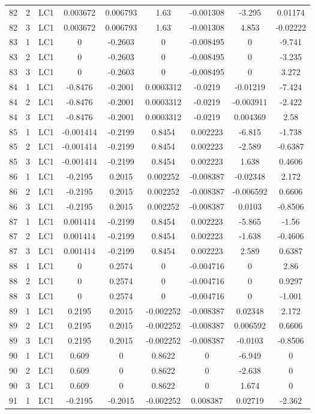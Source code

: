 \documentclass{article}%
\begin{document}
\begin{longtable}{| c c c | c c c c c c |}
82&2&LC1&0.003672&0.006793&1.63&{-}0.001308&{-}3.295&0.01174\\%
82&3&LC1&0.003672&0.006793&1.63&{-}0.001308&4.853&{-}0.02222\\%
83&1&LC1&0&{-}0.2603&0&{-}0.008495&0&{-}9.741\\%
83&2&LC1&0&{-}0.2603&0&{-}0.008495&0&{-}3.235\\%
83&3&LC1&0&{-}0.2603&0&{-}0.008495&0&3.272\\%
84&1&LC1&{-}0.8476&{-}0.2001&0.0003312&{-}0.0219&{-}0.01219&{-}7.424\\%
84&2&LC1&{-}0.8476&{-}0.2001&0.0003312&{-}0.0219&{-}0.003911&{-}2.422\\%
84&3&LC1&{-}0.8476&{-}0.2001&0.0003312&{-}0.0219&0.004369&2.58\\%
85&1&LC1&{-}0.001414&{-}0.2199&0.8454&0.002223&{-}6.815&{-}1.738\\%
85&2&LC1&{-}0.001414&{-}0.2199&0.8454&0.002223&{-}2.589&{-}0.6387\\%
85&3&LC1&{-}0.001414&{-}0.2199&0.8454&0.002223&1.638&0.4606\\%
86&1&LC1&{-}0.2195&0.2015&0.002252&{-}0.008387&{-}0.02348&2.172\\%
86&2&LC1&{-}0.2195&0.2015&0.002252&{-}0.008387&{-}0.006592&0.6606\\%
86&3&LC1&{-}0.2195&0.2015&0.002252&{-}0.008387&0.0103&{-}0.8506\\%
87&1&LC1&0.001414&{-}0.2199&0.8454&0.002223&{-}5.865&{-}1.56\\%
87&2&LC1&0.001414&{-}0.2199&0.8454&0.002223&{-}1.638&{-}0.4606\\%
87&3&LC1&0.001414&{-}0.2199&0.8454&0.002223&2.589&0.6387\\%
88&1&LC1&0&0.2574&0&{-}0.004716&0&2.86\\%
88&2&LC1&0&0.2574&0&{-}0.004716&0&0.9297\\%
88&3&LC1&0&0.2574&0&{-}0.004716&0&{-}1.001\\%
89&1&LC1&0.2195&0.2015&{-}0.002252&{-}0.008387&0.02348&2.172\\%
89&2&LC1&0.2195&0.2015&{-}0.002252&{-}0.008387&0.006592&0.6606\\%
89&3&LC1&0.2195&0.2015&{-}0.002252&{-}0.008387&{-}0.0103&{-}0.8506\\%
90&1&LC1&0.609&0&0.8622&0&{-}6.949&0\\%
90&2&LC1&0.609&0&0.8622&0&{-}2.638&0\\%
90&3&LC1&0.609&0&0.8622&0&1.674&0\\%
91&1&LC1&{-}0.2195&{-}0.2015&{-}0.002252&0.008387&0.02719&{-}2.362\\%

\end{longtable}
\end{document}
